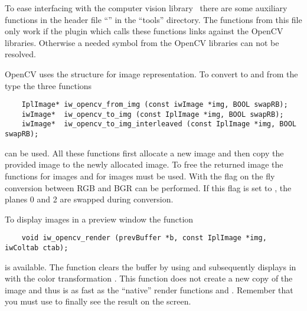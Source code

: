 To ease interfacing with the  computer vision
library~\cite{Intel2005-OSC} there are some auxiliary functions in
the header file ``'' in the ``tools'' directory. The
functions from this file only work if the plugin which calls these
functions links against the OpenCV libraries. Otherwise a needed
symbol from the OpenCV libraries can not be resolved.

OpenCV uses the  structure for image
representation. To convert to and from the \icewing{}
 type the three functions
\begin{small}
\linespread{0.9}
\begin{verbatim}
    IplImage* iw_opencv_from_img (const iwImage *img, BOOL swapRB);
    iwImage*  iw_opencv_to_img (const IplImage *img, BOOL swapRB);
    iwImage*  iw_opencv_to_img_interleaved (const IplImage *img, BOOL swapRB);
\end{verbatim}
\end{small}
can be used. All these functions first allocate a new image and then
copy the provided image to the newly allocated image. To free the
returned image the functions  for
 images and  for  images must be used. With
the flag  on the fly conversion between RGB and BGR can
be performed. If this flag is set to , the planes 0 and 2
are swapped during conversion.

To display  images in a preview window the function
\begin{small}
\linespread{0.9}
\begin{verbatim}
    void iw_opencv_render (prevBuffer *b, const IplImage *img, iwColtab ctab);
\end{verbatim}
\end{small}
is available. The function clears the buffer by using
 and subsequently displays  in 
with the color transformation . This function does not
create a new copy of the image and thus is as fast as the \icewing{}
``native'' render functions  and
. Remember that you must use
 to finally see the result on the screen.

